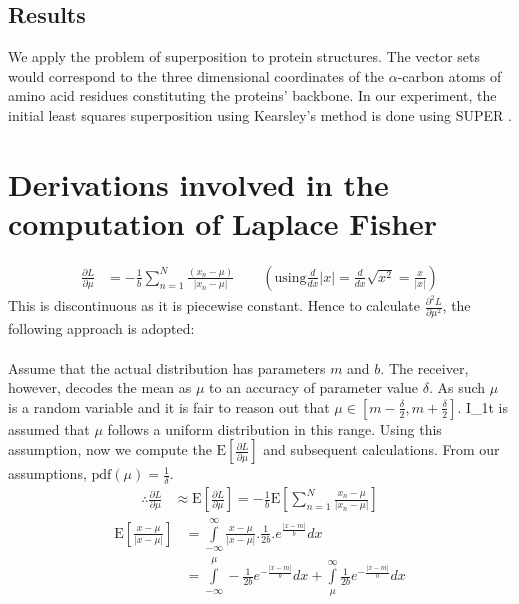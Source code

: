 \documentclass[wcp]{jmlr}
\begin{document}
\subsection*{Results}
We apply the problem of superposition to protein structures. The vector sets would
correspond to the three dimensional coordinates of the $\alpha$-carbon atoms of 
amino acid residues constituting the proteins' backbone. In our experiment, the 
initial least squares superposition using Kearsley's method is done using SUPER \citep{super}.





\appendix
\section{Derivations involved in the computation of Laplace Fisher}
\label{apd:laplace_fisher}
\begin{align*}
 \frac{\partial L}{\partial \mu} &= -\frac{1}{b} \sum_{n=1}^N \frac{(x_n-\mu)}{|x_n-\mu|} \quad\quad\left(\mathrm{using} \frac{d}{dx}|x| = \frac{d}{dx}\sqrt{x^2} = \frac{x}{|x|}\right)
\end{align*}
This is discontinuous as it is piecewise constant. Hence to calculate $\frac{\partial^2 L}{\partial \mu^2}$, the following approach is adopted: \\\\
Assume that the actual distribution has parameters $m$ and 
$b$. The receiver, however, decodes the mean as $\mu$ to an accuracy of parameter
value $\delta$. As such $\mu$ is a random variable and it is fair to reason out
that $\mu \in \left[m-\frac{\delta}{2},m+\frac{\delta}{2}\right]$. I_1t is 
assumed that $\mu$ follows a uniform distribution in this range. Using this 
assumption, now we compute the $\mathrm{E}\left[\frac{\partial L}{\partial \mu}\right]$ 
and subsequent calculations. From our assumptions, $\mathrm{pdf}(\mu) = \frac{1}{\delta}$.
\begin{align*}
 \therefore \frac{\partial L}{\partial \mu} &\approx \mathrm{E}\left[\frac{\partial L}{\partial \mu}\right] = -\frac{1}{b}\mathrm{E}\left[\sum_{n=1}^{N}\frac{x_n-\mu}{|x_n-\mu|}\right]
\end{align*}
\begin{align*}
 \mathrm{E}\left[\frac{x-\mu}{|x-\mu|}\right] &= \int\limits_{-\infty}^{\infty} \frac{x-\mu}{|x-\mu|}.\frac{1}{2b}.e^{\frac{|x-m|}{b}} dx \\
 &= \int\limits_{-\infty}^{\mu} -\frac{1}{2b} e^{-\frac{|x-m|}{b}} dx + \int\limits_{\mu}^{\infty} \frac{1}{2b} e^{-\frac{|x-m|}{b}} dx
\end{align*}
\end{document}

